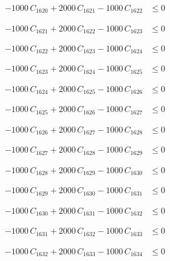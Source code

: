 \documentclass[a4paper,11pt]{article}
\begin{document}
\begin{align}
-1000\,C_{1620} + 2000\,C_{1621} - 1000\,C_{1622} &\leq 0 \nonumber
\end{align}

\begin{align}
-1000\,C_{1621} + 2000\,C_{1622} - 1000\,C_{1623} &\leq 0 \nonumber
\end{align}

\begin{align}
-1000\,C_{1622} + 2000\,C_{1623} - 1000\,C_{1624} &\leq 0 \nonumber
\end{align}

\begin{align}
-1000\,C_{1623} + 2000\,C_{1624} - 1000\,C_{1625} &\leq 0 \nonumber
\end{align}

\begin{align}
-1000\,C_{1624} + 2000\,C_{1625} - 1000\,C_{1626} &\leq 0 \nonumber
\end{align}

\begin{align}
-1000\,C_{1625} + 2000\,C_{1626} - 1000\,C_{1627} &\leq 0 \nonumber
\end{align}

\begin{align}
-1000\,C_{1626} + 2000\,C_{1627} - 1000\,C_{1628} &\leq 0 \nonumber
\end{align}

\begin{align}
-1000\,C_{1627} + 2000\,C_{1628} - 1000\,C_{1629} &\leq 0 \nonumber
\end{align}

\begin{align}
-1000\,C_{1628} + 2000\,C_{1629} - 1000\,C_{1630} &\leq 0 \nonumber
\end{align}

\begin{align}
-1000\,C_{1629} + 2000\,C_{1630} - 1000\,C_{1631} &\leq 0 \nonumber
\end{align}

\begin{align}
-1000\,C_{1630} + 2000\,C_{1631} - 1000\,C_{1632} &\leq 0 \nonumber
\end{align}

\begin{align}
-1000\,C_{1631} + 2000\,C_{1632} - 1000\,C_{1633} &\leq 0 \nonumber
\end{align}

\begin{align}
-1000\,C_{1632} + 2000\,C_{1633} - 1000\,C_{1634} &\leq 0 \nonumber
\end{align}
\end{document}
